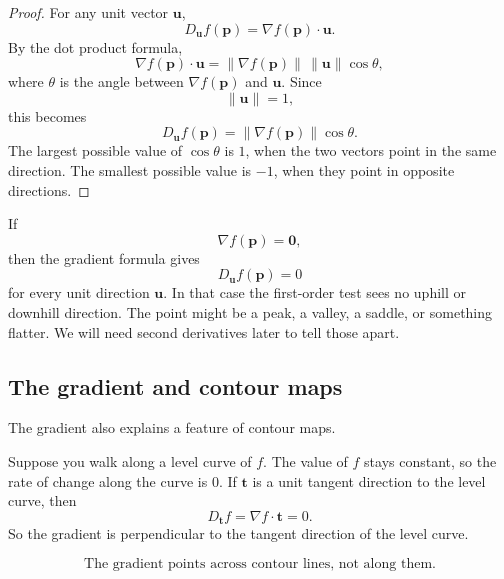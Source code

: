 \begin{proof}
For any unit vector \(\mathbf u\),
\[
    D_{\mathbf u}f(\mathbf p)
    =
    \nabla f(\mathbf p)\cdot\mathbf u.
\]
By the dot product formula,
\[
    \nabla f(\mathbf p)\cdot\mathbf u
    =
    \|\nabla f(\mathbf p)\|\,\|\mathbf u\|\cos\theta,
\]
where \(\theta\) is the angle between \(\nabla f(\mathbf p)\) and \(\mathbf u\).  Since
\[
    \|\mathbf u\|=1,
\]
this becomes
\[
    D_{\mathbf u}f(\mathbf p)
    =
    \|\nabla f(\mathbf p)\|\cos\theta.
\]
The largest possible value of \(\cos\theta\) is \(1\), when the two vectors point in the
same direction.  The smallest possible value is \(-1\), when they point in opposite
directions.
\end{proof}

If
\[
    \nabla f(\mathbf p)=\mathbf 0,
\]
then the gradient formula gives
\[
    D_{\mathbf u}f(\mathbf p)=0
\]
for every unit direction \(\mathbf u\).  In that case the first-order test sees no uphill or
downhill direction.  The point might be a peak, a valley, a saddle, or something flatter.
We will need second derivatives later to tell those apart.

\subsection{The gradient and contour maps}

The gradient also explains a feature of contour maps.

Suppose you walk along a level curve of \(f\).  The value of \(f\) stays constant, so the
rate of change along the curve is \(0\).  If \(\mathbf t\) is a unit tangent direction to the
level curve, then
\[
    D_{\mathbf t}f=\nabla f\cdot\mathbf t=0.
\]
So the gradient is perpendicular to the tangent direction of the level curve.

\[
    \text{The gradient points across contour lines, not along them.}
\]

